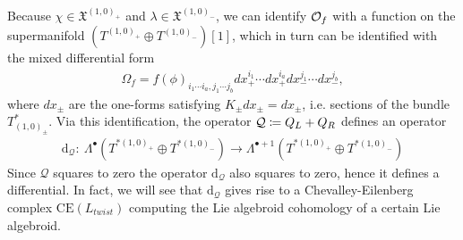 \documentclass[letterpaper,12pt]{article}
\newcommand{\XX}{\mathfrak{X}}
\newcommand{\QQ}{\mathcal{Q}}
\newcommand{\rd}{\mathrm{d}}
\theoremstyle{definition}
\theoremstyle{remark}
\theoremstyle{examples}
\begin{document}
Because $\chi \in \XX^{(1,0)_+}$ and $\lambda \in \XX^{(1,0)_-}$, we can identify ${\cal O}_f$ with a function on the supermanifold $(T^{(1,0)_+}\oplus T^{(1,0)_-})[1]$, which in turn can be identified with the mixed differential form
\begin{align*}
\Omega_f=f(\phi)_{i_1\cdots i_a,j_1\cdots j_b}dx^{i_1}_+\cdots dx^{i_a}_+ dx^{j_1}_- \cdots dx^{j_b}_-,
\end{align*}
where $dx_\pm$ are the one-forms satisfying $K_\pm dx_\pm=dx_\pm$, i.e. sections of the bundle $T^*_{(1,0)_\pm}$. Via this identification, the operator ${\cal Q}\coloneqq Q_L+Q_R$ defines an operator
\begin{align*}
\rd_\QQ:\ \Lambda^\bullet(T^{*(1,0)_+}\oplus T^{*(1,0)_-})\rightarrow \Lambda^{\bullet +1}(T^{*(1,0)_+}\oplus T^{*(1,0)_-})
\end{align*}
Since $\QQ$ squares to zero the operator $\rd_\QQ$ also squares to zero, hence it defines a differential. 
In fact, we will see that $\rd_\QQ$ gives rise to a Chevalley-Eilenberg complex $\text{CE}(L_{twist})$ computing the Lie algebroid cohomology of a certain Lie algebroid.
\end{document}
